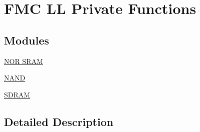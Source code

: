 \hypertarget{group___f_m_c___l_l___private___functions}{}\section{F\+MC LL Private Functions}
\label{group___f_m_c___l_l___private___functions}
\subsection*{Modules}
\begin{DoxyCompactItemize}
\item 
\hyperlink{group___f_m_c___l_l___n_o_r_s_r_a_m}{N\+O\+R S\+R\+AM}
\item 
\hyperlink{group___f_m_c___l_l___n_a_n_d}{N\+A\+ND}
\item 
\hyperlink{group___f_m_c___l_l___s_d_r_a_m}{S\+D\+R\+AM}
\end{DoxyCompactItemize}


\subsection{Detailed Description}
